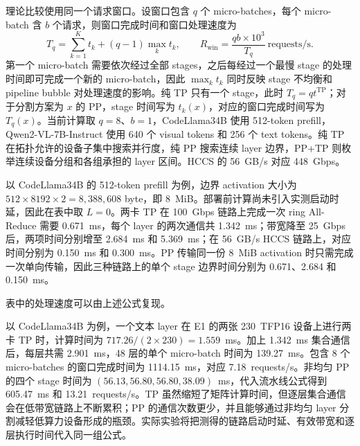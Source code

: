 理论比较使用同一个请求窗口。设窗口包含 \(q\) 个 micro-batches，每个 micro-batch 含 \(b\) 个请求，则窗口完成时间和窗口处理速度为
\[
T_q=\sum_{k=1}^{K}t_k+(q-1)\max_k t_k,
\qquad
R_{\mathrm{win}}=\frac{qb\times10^3}{T_q}\ \mathrm{requests/s}.
\]
第一个 micro-batch 需要依次经过全部 stages，之后每经过一个最慢 stage 的处理时间即可完成一个新的 micro-batch，因此 \(\max_k t_k\) 同时反映 stage 不均衡和 pipeline bubble 对处理速度的影响。纯 TP 只有一个 stage，此时 \(T_q=qt^{\mathrm{TP}}\)；对于分割方案为 \(x\) 的 PP，stage 时间写为 \(t_k(x)\)，对应的窗口完成时间写为 \(T_q(x)\)。当前计算取 \(q=8\)、\(b=1\)，CodeLlama34B 使用 512-token prefill，Qwen2-VL-7B-Instruct 使用 640 个 visual tokens 和 256 个 text tokens。纯 TP 在拓扑允许的设备子集中搜索并行度，纯 PP 搜索连续 layer 边界，PP+TP 则枚举连续设备分组和各组承担的 layer 区间。HCCS 的 56~GB/s 对应 448~Gbps。

以 CodeLlama34B 的 512-token prefill 为例，边界 activation 大小为 \(512\times8192\times2=8{,}388{,}608\) byte，即 8~MiB。部署前计算尚未引入实测启动时延，因此在表中取 \(L=0\)。两卡 TP 在 100~Gbps 链路上完成一次 ring All-Reduce 需要 0.671~ms，每个 layer 的两次通信共 1.342~ms；带宽降至 25~Gbps 后，两项时间分别增至 2.684~ms 和 5.369~ms；在 56~GB/s HCCS 链路上，对应时间分别为 0.150~ms 和 0.300~ms。PP 传输同一份 8~MiB activation 时只需完成一次单向传输，因此三种链路上的单个 stage 边界时间分别为 0.671、2.684 和 0.150~ms。

表中的处理速度可以由上述公式复现。

以 CodeLlama34B 为例，一个文本 layer 在 E1 的两张 230~TFP16 设备上进行两卡 TP 时，计算时间为 \(717.26/(2\times230)=1.559\)~ms。加上 1.342~ms 集合通信后，每层共需 2.901~ms，48 层的单个 micro-batch 时间为 139.27~ms。包含 8 个 micro-batches 的窗口完成时间为 1114.15~ms，对应 7.18~requests/s。非均匀 PP 的四个 stage 时间为 \((56.13,56.80,56.80,38.09)\)~ms，代入流水线公式得到 605.47~ms 和 13.21~requests/s。TP 虽然缩短了矩阵计算时间，但逐层集合通信会在低带宽链路上不断累积；PP 的通信次数更少，并且能够通过非均匀 layer 分割减轻低算力设备形成的瓶颈。实际实验将把测得的链路启动时延、有效带宽和逐层执行时间代入同一组公式。

